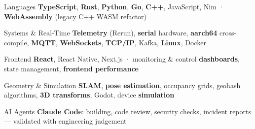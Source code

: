 
\begin{cvskills}

  \cvskill
  {Languages}
  {\textbf{TypeScript}, \textbf{Rust}, \textbf{Python}, \textbf{Go}, \textbf{C++}, JavaScript, Nim · \textbf{WebAssembly} (legacy C++ WASM refactor)}

  \cvskill
  {Systems \& Real-Time}
  {\textbf{Telemetry} (Rerun), \textbf{serial} hardware, \textbf{aarch64} cross-compile, \textbf{MQTT}, \textbf{WebSockets}, \textbf{TCP/IP}, Kafka, \textbf{Linux}, Docker}

  \cvskill
  {Frontend}
  {\textbf{React}, React Native, Next.js · monitoring \& control \textbf{dashboards}, state management, \textbf{frontend performance}}

  \cvskill
  {Geometry \& Simulation}
  {\textbf{SLAM}, \textbf{pose estimation}, occupancy grids, geohash algorithms, \textbf{3D transforms}, Godot, device \textbf{simulation}}

  \cvskill
  {AI Agents}
  {\textbf{Claude Code}: building, code review, security checks, incident reports --- validated with engineering judgement}

\end{cvskills}
